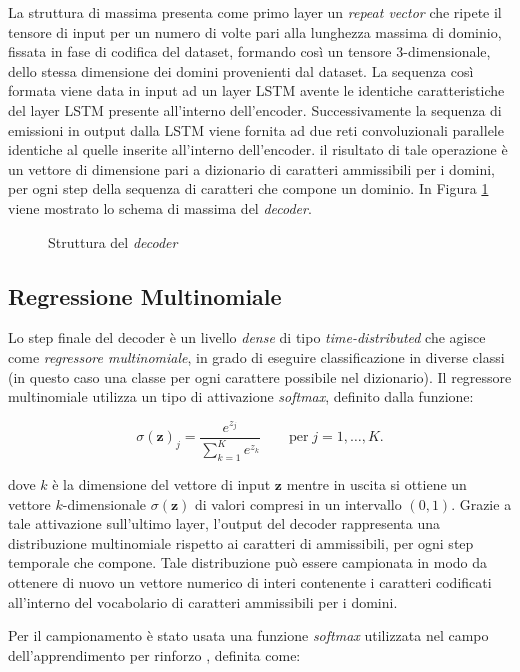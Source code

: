 La struttura di massima presenta come primo layer un \textit{repeat vector} che ripete il tensore di input per un numero di volte pari alla lunghezza massima di dominio, fissata in fase di codifica del dataset, formando così un tensore 3-dimensionale, dello stessa dimensione dei domini provenienti dal dataset. La sequenza così formata viene data in input ad un layer LSTM avente le identiche caratteristiche del layer LSTM presente all'interno dell'encoder. Successivamente la sequenza di emissioni in output dalla LSTM viene fornita ad due reti convoluzionali parallele identiche al quelle inserite all'interno dell'encoder. il risultato di tale operazione è un vettore di dimensione pari a dizionario di caratteri ammissibili per i domini, per ogni step della sequenza di caratteri che compone un dominio. In Figura \ref{fig:decoder} viene mostrato lo schema di massima del \textit{decoder}.

\begin{figure}[!htb]
    \centering
	
	\caption{Struttura del \textit{decoder}}
\label{fig:decoder}
\end{figure}

\subsection{Regressione Multinomiale}
Lo step finale del decoder è un livello \textit{dense} di tipo \textit{time-distributed} che agisce come \textit{regressore multinomiale}, in grado di eseguire classificazione in diverse classi (in questo caso una classe per ogni carattere possibile nel dizionario). Il regressore multinomiale utilizza un tipo di attivazione \textit{softmax}, definito dalla funzione:

\[\sigma(\mathbf{z})_j = \frac{e^{z_j}}{\sum_{k=1}^K e^{z_k}}\qquad  \text{per}\; j=1,\ldots,K. \] 

dove $k$ è la dimensione del vettore di input $\mathbf{z}$ mentre in uscita si ottiene un vettore $k$-dimensionale $\sigma(\mathbf{z})$ di valori compresi in un intervallo $\left(0,1\right)$. Grazie a tale attivazione sull'ultimo layer, l'output del decoder rappresenta una distribuzione multinomiale rispetto ai caratteri di ammissibili, per ogni step temporale che compone. 
Tale distribuzione può essere campionata in modo da ottenere di nuovo un vettore numerico di interi contenente i caratteri codificati all'interno del vocabolario di caratteri ammissibili per i domini. 

Per il campionamento è stato usata una funzione \textit{softmax} utilizzata nel campo dell'apprendimento per rinforzo \cite{reinflearning}, definita come: 


